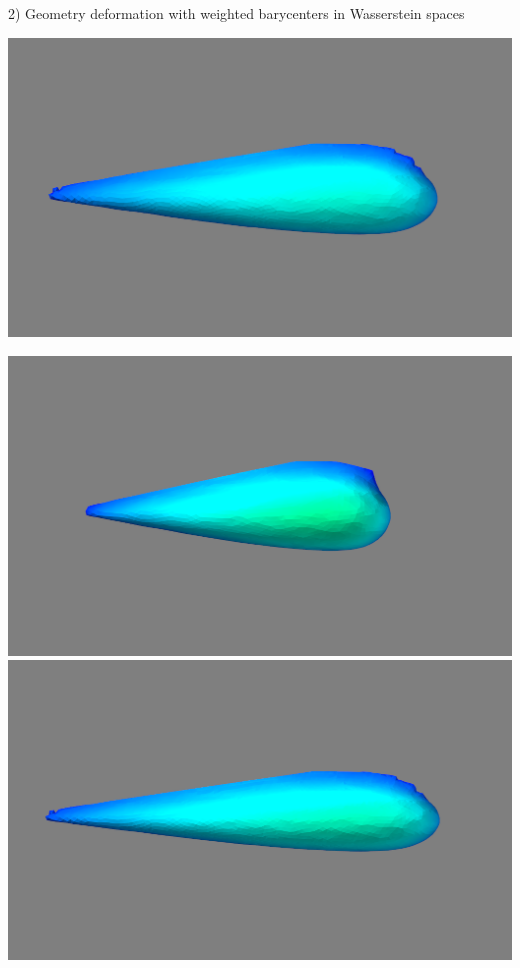\documentclass[b0paper,portrait]{baposter}
\begin{document}
\begin{poster}
\begin{posterbox}[name=otm,below=introduction,span=6,column=0]{2) Geometry deformation with weighted barycenters in Wasserstein spaces}
\begin{minipage}{0.46\textwidth}
\begin{center}
\includegraphics[scale=0.1]{figure_a.png} \\
\end{center}
\begin{center} \includegraphics[scale=0.1]{figure_ab}   \quad \includegraphics[scale=0.1]{figure_ca} \\


\end{center}
\end{minipage}
\end{posterbox}
\end{poster}
\end{document}
